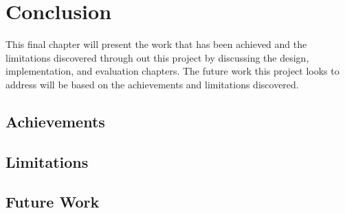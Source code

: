 %
\chapter{Conclusion}
\label{sec:conclusion}
 \noindent This final chapter will present the work that has been achieved and the limitations discovered through out this project by discussing the design, implementation, and evaluation chapters. The future work this project looks to address will be based on the achievements and limitations discovered.

\section{Achievements}
\label{sec:conclusion:sec1}


\section{Limitations}
\label{sec:conclusion:limitations}


\section{Future Work}
\label{sec:conclusion:future}

